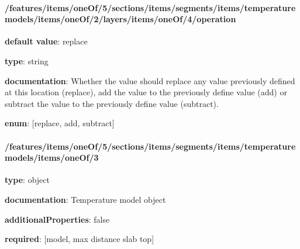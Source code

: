 \begin{itemized}
\end{itemized}\paragraph{/features/items/oneOf/5/sections/items/segments/items/temperature models/items/oneOf/2/layers/items/oneOf/4/operation} \begin{itemized}
\item {\bf default value}: replace
\item {\bf type}: string
\item {\bf documentation}: Whether the value should replace any value previously defined at this location (replace), add the value to the previously define value (add) or subtract the value to the previously define value (subtract).
\item {\bf enum}: [replace, add, subtract]\end{itemized}\paragraph{/features/items/oneOf/5/sections/items/segments/items/temperature models/items/oneOf/3} \begin{itemized}
\item {\bf type}: object
\item {\bf documentation}: Temperature model object
\item {\bf additionalProperties}: false
\item {\bf required}: [model, max distance slab top]\end{itemized}
